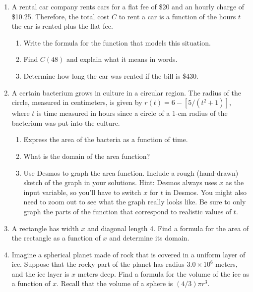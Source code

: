 \documentclass[11pt]{article}
\begin{document}
\begin{enumerate}
\setcounter{enumi}{\theenumCount}
\item A rental car company rents cars for a flat fee of \$20 and an hourly charge of \$10.25. Therefore, the total cost $C$ to rent a car is a function of the hours $t$ the car is rented plus the flat fee.
\begin{enumerate}
\item Write the formula for the function that models this situation. \vfill
\item Find $C(48)$ and explain what it means in words. \vfill
\item Determine how long the car was rented if the bill is \$430. \vfill
\end{enumerate}


\item A certain bacterium grows in culture in a circular region. The radius of the circle, measured in centimeters, is given by $r(t)=6-[5/(t^2+1)]$, where $t$ is time measured in hours since a circle of a 1-cm radius of the bacterium was put into the culture.
\begin{enumerate}
\item Express the area of the bacteria as a function of time.\vfill
\item What is the domain of the area function?\vfill
\item Use Desmos to graph the area function.  Include a rough (hand-drawn) sketch of the graph in your solutions. Hint: Desmos always uses $x$ as the input variable, so you'll have to switch $x$ for $t$ in Desmos.  You might also need to zoom out to see what the graph really looks like. Be sure to only graph the parts of the function that correspond to realistic values of $t$.
\vfill
\vfill
\end{enumerate}

\newpage
\item A rectangle has width $x$ and diagonal length 4.  Find a formula for the area of the rectangle as a function of $x$ and determine its domain.
\begin{flushright}
\end{flushright}

\item Imagine a spherical planet made of rock that is covered in a uniform layer of ice.  Suppose that the rocky part of the planet has radius $3.0 \times 10^6$ meters, and the ice layer is $x$ meters deep. Find a formula for the volume of the ice as a function of $x$. Recall that the volume of a sphere is $(4/3)\pi r^3$. \vfill 


\end{enumerate}
\end{document}
